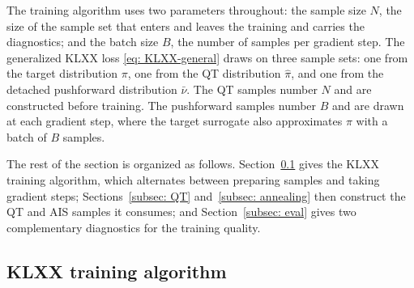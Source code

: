 \documentclass{article}
\begin{document}
{\color{blue}The training algorithm uses two parameters throughout:} the sample size $N$, the size of the sample set that enters and leaves the training and carries the diagnostics; and the batch size $B$, the number of samples per gradient step.
The generalized KLXX loss \eqref{eq: KLXX-general} draws on three sample sets: one from the target distribution $\pi$, one from the QT distribution $\hat\pi$, and one from the detached pushforward distribution $\bar\nu$. The QT samples number $N$ and are constructed before training. The pushforward samples number $B$ and are drawn at each gradient step, {\color{blue}where the target surrogate also approximates} $\pi$ with a batch of $B$ samples.

The rest of the section is organized as follows. Section~\ref{subsec: training-algorithm} gives the KLXX training algorithm, which alternates between preparing samples and taking gradient steps; Sections~\ref{subsec: QT} and~\ref{subsec: annealing} then construct the QT and AIS samples it consumes; and Section~\ref{subsec: eval} gives two complementary diagnostics for the training quality.

\subsection{KLXX training algorithm}
\label{subsec: training-algorithm}
\end{document}
